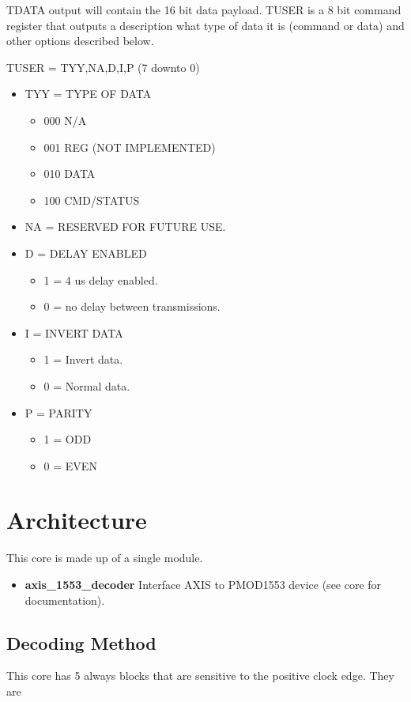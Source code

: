 \par
TDATA output will contain the 16 bit data payload. TUSER is a 8 bit command register
that outputs a description what type of data it is (command or data) and other options
described below.

TUSER = {TYY,NA,D,I,P} (7 downto 0)
\begin{itemize}
\item TYY = TYPE OF DATA
  \begin{itemize}
    \item 000 N/A
    \item 001 REG (NOT IMPLEMENTED)
    \item 010 DATA
    \item 100 CMD/STATUS
  \end{itemize}
  \item NA = RESERVED FOR FUTURE USE.
  \item D = DELAY ENABLED
  \begin{itemize}
    \item 1 = 4 us delay enabled.
    \item 0 = no delay between transmissions.
  \end{itemize}
  \item I = INVERT DATA
  \begin{itemize}
    \item 1 = Invert data.
    \item 0 = Normal data.
  \end{itemize}
  \item P = PARITY
  \begin{itemize}
    \item 1 = ODD
    \item 0 = EVEN
  \end{itemize}
\end{itemize}

\section{Architecture}
\par
This core is made up of a single module.
\begin{itemize}
  \item \textbf{axis\_1553\_decoder} Interface AXIS to PMOD1553 device (see core for documentation).
\end{itemize}

\subsection{Decoding Method}
\par
This core has 5 always blocks that are sensitive to the positive clock edge. They are

